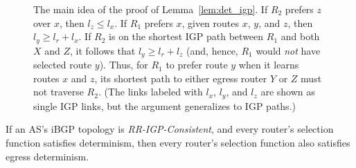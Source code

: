 \begin{figure}
\begin{center}
\begin{psfrags}
\end{psfrags}
\end{center}
\caption[The main idea of the proof of
  Lemma~\ref{lem:det_igp}.  ]{The main idea of the proof of
  Lemma~\ref{lem:det_igp}.  
%
If $R_2$ prefers $z$ over $x$, then $l_z \leq l_x$.
%
If $R_1$ prefers $x$, given routes $x$, $y$, and $z$, then $l_y \geq
  l_r + l_x$.  If $R_2$ is on the shortest IGP path between $R_1$ and
  both $X$ and $Z$, it follows that $l_y \geq l_r + l_z$ (and, hence,
  $R_1$ would {\em not} have selected route $y$).  Thus, for $R_1$ to
  prefer route $y$ when it learns routes $x$ and $z$, its shortest path
  to either egress router $Y$ or $Z$ must not traverse $R_2$. (The links
  labeled with $l_x$, $l_y$, and $l_z$ are shown as single IGP links,
  but the argument generalizes to IGP paths.)}
\label{fig:det_igp}
\end{figure}



\begin{lemma}\label{lem:det_igp}
If an AS's iBGP topology is {\em RR-IGP-Consistent}, and every router's
selection function satisfies determinism, then every router's selection
function also satisfies egress determinism.
\end{lemma}

